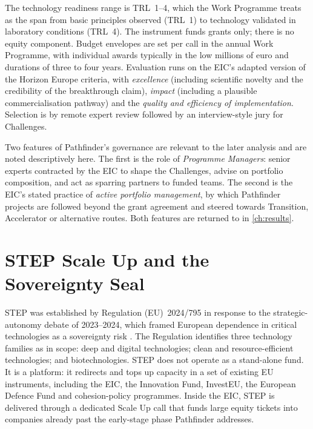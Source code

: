 The technology readiness range is TRL~1--4, which the Work Programme
treats as the span from basic principles observed (TRL~1) to
technology validated in laboratory conditions (TRL~4). The instrument
funds grants only; there is no equity component. Budget envelopes are
set per call in the annual Work Programme, with individual awards
typically in the low millions of euro and durations of three to four
years. Evaluation runs on the EIC's adapted version of the Horizon
Europe criteria, with \emph{excellence} (including scientific novelty
and the credibility of the breakthrough claim), \emph{impact}
(including a plausible commercialisation pathway) and the
\emph{quality and efficiency of implementation}. Selection is by
remote expert review followed by an interview-style jury for Challenges.

Two features of Pathfinder's governance are relevant to the later
analysis and are noted descriptively here. The first is the role of
\emph{Programme Managers}: senior experts contracted by the EIC to
shape the Challenges, advise on portfolio composition, and act as
sparring partners to funded teams. The second is the EIC's stated
practice of \emph{active portfolio management}, by which Pathfinder
projects are followed beyond the grant agreement and steered towards
Transition, Accelerator or alternative routes. Both features are
returned to in \cref{ch:results}.

\section{STEP Scale Up and the Sovereignty Seal}
\label{sec:bg-step}

STEP was established by Regulation (EU)~2024/795 in response to the
strategic-autonomy debate of 2023--2024, which framed European
dependence in critical technologies as a sovereignty risk
\parencite{eu2024step}. The Regulation identifies three technology
families as in scope: deep and digital technologies; clean and
resource-efficient technologies; and biotechnologies. STEP does not
operate as a stand-alone fund. It is a platform: it redirects and
tops up capacity in a set of existing EU instruments, including the
EIC, the Innovation Fund, InvestEU, the European Defence Fund and
cohesion-policy programmes. Inside the EIC, STEP is delivered through
a dedicated Scale Up call that funds large equity tickets into
companies already past the early-stage phase Pathfinder addresses.

